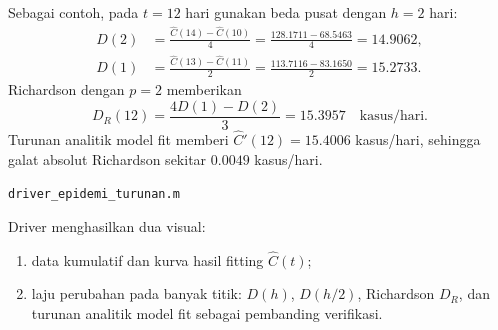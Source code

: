 \documentclass[book,english,noindex,lean,nobackpage,nocopyright,noupdate,nofiglist,notablist]{enacom}
\newcommand{\MatlabFile}[1]{\par\smallskip\noindent\texttt{#1}\par}
\begin{document}
Sebagai contoh, pada $t=12$ hari gunakan beda pusat dengan $h=2$ hari:
\begin{align}
D(2)
&=\frac{\widehat C(14)-\widehat C(10)}{4}
=\frac{128.1711-68.5463}{4}
=14.9062,\\
D(1)
&=\frac{\widehat C(13)-\widehat C(11)}{2}
=\frac{113.7116-83.1650}{2}
=15.2733.
\end{align}
Richardson dengan $p=2$ memberikan
\begin{equation}
D_R(12)=\frac{4D(1)-D(2)}{3}
=15.3957\quad\text{kasus/hari}.
\label{eq:epi-rich-example}
\end{equation}
Turunan analitik model fit memberi $\widehat C'(12)=15.4006$ kasus/hari, sehingga galat absolut Richardson sekitar $0.0049$ kasus/hari.

\MatlabFile{driver\_epidemi\_turunan.m}


Driver menghasilkan dua visual:
\begin{enumerate}
\item data kumulatif dan kurva hasil fitting $\widehat C(t)$;
\item laju perubahan pada banyak titik: $D(h)$, $D(h/2)$, Richardson $D_R$, dan turunan analitik model fit sebagai pembanding verifikasi.
\end{enumerate}
\end{document}
